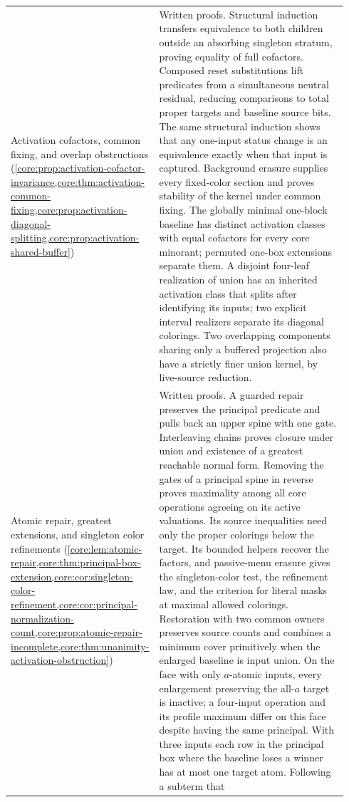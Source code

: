 {\begin{longtable}{>{\raggedright\arraybackslash}p{0.34\linewidth}>{\raggedright\arraybackslash}p{0.60\linewidth}}
Activation cofactors, common fixing, and overlap obstructions
(\cref{core:prop:activation-cofactor-invariance,core:thm:activation-common-fixing,core:prop:activation-diagonal-splitting,core:prop:activation-shared-buffer})
 & Written proofs. Structural induction transfers equivalence to both
children outside an absorbing singleton stratum, proving equality of
full cofactors. Composed reset substitutions lift predicates from a
simultaneous neutral residual, reducing comparisons to total proper
targets and baseline source bits. The same structural induction
shows that any one-input status change is an equivalence exactly
when that input is captured. Background erasure supplies every
fixed-color section and proves stability of the kernel under common
fixing. The globally minimal one-block baseline has distinct activation
classes with equal cofactors for every core minorant; permuted one-box
extensions separate them. A disjoint four-leaf realization of
union has an inherited activation class that splits after identifying
its inputs; two explicit interval realizers separate its diagonal
colorings. Two overlapping components sharing only a buffered projection
also have a strictly finer union kernel, by live-source reduction.\\
Atomic repair, greatest extensions, and singleton color refinements
(\cref{core:lem:atomic-repair,core:thm:principal-box-extension,core:cor:singleton-color-refinement,core:cor:principal-normalization-count,core:prop:atomic-repair-incomplete,core:thm:unanimity-activation-obstruction})
 & Written proofs. A guarded repair preserves the principal predicate
and pulls back an upper spine with one gate. Interleaving chains proves
closure under union and existence of a greatest reachable normal form.
Removing the gates of a principal spine in reverse proves maximality
among all core operations agreeing on its active valuations. Its
source inequalities need only the proper colorings below the target.
Its bounded helpers recover the factors, and passive-menu erasure gives
the singleton-color test, the refinement law, and the criterion for
literal masks at maximal allowed colorings. Restoration with two
common owners preserves source counts and combines a minimum cover
primitively when the enlarged baseline is input union.
On the face with only $a$-atomic inputs, every enlargement preserving
the all-$a$ target is inactive; a four-input operation and its profile
maximum differ on this face despite having the same principal.
With three inputs each row in the principal box where the baseline
loses a winner has at most one target atom. Following a subterm that

\end{longtable}}
